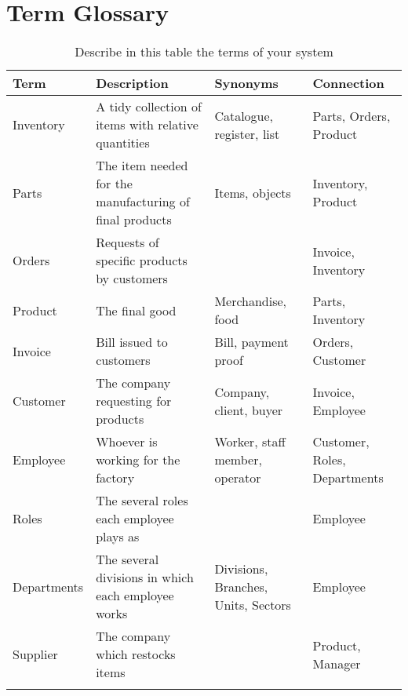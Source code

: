 \section{Term Glossary}




%

\begin{longtable}{|p{}|p{} |p{}|p{}|} 
\hline
\textbf{Term} & \textbf{Description} & \textbf{Synonyms} & \textbf{Connection} \\\hline
Inventory & A tidy collection of items with relative quantities & Catalogue, register, list &  Parts, Orders, Product \vspace{5pt} \\\hline
Parts & The item needed for the manufacturing of final products & Items, objects & Inventory, Product\\\hline
Orders & Requests of specific products by customers & & Invoice, Inventory\\\hline
Product & The final good & Merchandise, food & Parts, Inventory\\\hline
Invoice & Bill issued to customers & Bill, payment proof & Orders, Customer\\\hline
Customer & The company requesting for products & Company, client, buyer & Invoice, Employee\\\hline
Employee & Whoever is working for the factory & Worker, staff member, operator & Customer, Roles, Departments\\\hline
Roles & The several roles each employee plays as & & Employee\\\hline
Departments & The several divisions in which each employee works & Divisions, Branches, Units, Sectors & Employee\\\hline
Supplier & The company which restocks items & & Product, Manager\\\hline

\caption{Describe in this table the terms of your system}
\label{tab:termGlossary}
\end{longtable}